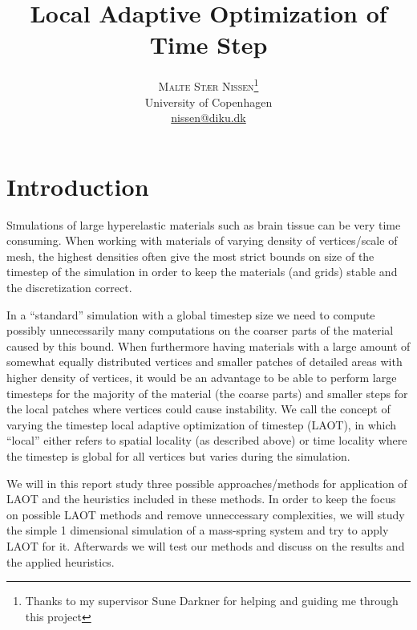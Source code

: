 \documentclass[11pt]{article}
\title{\vspace{-15mm}\fontsize{24pt}{10pt}\selectfont\textbf{Local Adaptive
Optimization of Time Step}} %
\author{
\large
\textsc{Malte Stær Nissen}\thanks{Thanks to my supervisor Sune Darkner for
helping and guiding me through this project}\\[2mm] %
\normalsize University of Copenhagen \\ %
\normalsize \href{mailto:nissen@diku.dk}{nissen@diku.dk} %
\vspace{-5mm}
}
\date{}
\begin{document}
\maketitle %

\thispagestyle{fancy} %







\section{Introduction}
\lettrine[nindent=0em,lines=3]{S} imulations of large hyperelastic materials
such as brain tissue
can be very time consuming. When working with materials of varying density
of vertices/scale of mesh, the highest densities often give the most
strict bounds on size of the timestep of the simulation in order to keep
the materials (and grids) stable and the discretization correct.

In a ``standard'' simulation with a global timestep size we need to compute
possibly unnecessarily many computations on the coarser parts of the material
caused by this bound. When furthermore having materials with a large amount
of somewhat equally distributed vertices and smaller patches of detailed
areas with higher density of vertices, it would be an advantage to be able
to perform large timesteps for the majority of the material (the coarse
parts) and smaller steps for the local patches where vertices could cause
instability. We call the concept of varying the timestep local adaptive
optimization of timestep (LAOT), in which ``local'' either refers to spatial
locality (as described above) or time locality where the timestep is global
for all vertices but varies during the simulation.

We will in this report
study three possible approaches/methods for application of LAOT and the
heuristics included in these methods. In order to keep the focus
on possible LAOT methods and remove unneccessary complexities, we will study
the simple 1 dimensional simulation of a mass-spring system and try to apply
LAOT for it. Afterwards we will test our methods and discuss on the results and
the applied heuristics.
\end{document}
